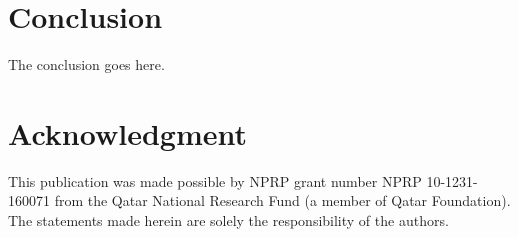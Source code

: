\documentclass[journal,comsoc]{IEEEtran}
\renewcommand{\^}{\hat}  %
\begin{document}



\section{Conclusion}
The conclusion goes here.






%
\section*{Acknowledgment}
%
This publication was made possible by NPRP grant number NPRP 10-1231-160071 from the Qatar National Research Fund (a member of Qatar Foundation). The statements made herein are solely the responsibility of the authors.
\end{document}

